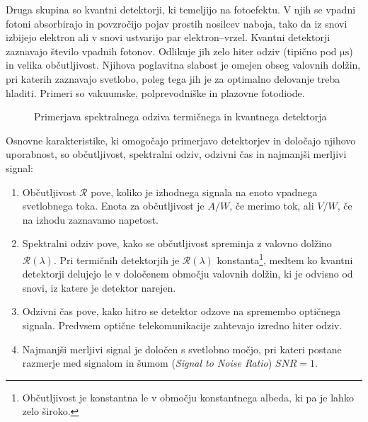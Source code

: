 Druga skupina so kvantni detektorji, ki temeljijo na fotoefektu.
V njih se vpadni fotoni absorbirajo in povzročijo pojav prostih nosilcev naboja, 
tako da iz snovi izbijejo elektron ali v snovi ustvarijo par elektron--vrzel. Kvantni 
detektorji zaznavajo število vpadnih fotonov. Odlikuje jih zelo hiter odziv 
(tipično pod $\si{\micro\second}$)
in velika občutljivost. Njihova poglavitna slabost je omejen obseg valovnih dolžin,
pri katerih zaznavajo svetlobo, poleg tega jih je za optimalno delovanje treba 
hladiti. Primeri so vakuumske, polprevodniške in plazovne fotodiode.
\begin{figure}[h]
\centering
\def\svgwidth{60truemm} 

\caption{Primerjava spektralnega odziva termičnega in kvantnega detektorja}
\label{fig:shemaTermKv}
\end{figure}

Osnovne karakteristike, ki omogočajo primerjavo detektorjev in določajo njihovo uporabnost,
so občutljivost, spektralni odziv, odzivni čas in najmanjši merljivi signal:

\begin{enumerate}
\item Občutljivost $\mathcal{R}$ pove, koliko je izhodnega signala 
na enoto vpadnega svetlobnega toka. Enota za občutljivost je $\si{A/W}$, če merimo tok, ali 
$\si{V/W}$, če na izhodu zaznavamo napetost. 
\item Spektralni odziv pove, kako se občutljivost spreminja z valovno dolžino $\mathcal{R}(\lambda)$.
Pri termičnih detektorjih je $\mathcal{R}(\lambda)$ konstanta\footnote{Občutljivost je konstantna
le v območju konstantnega albeda, ki pa je lahko zelo široko.}, medtem ko kvantni detektorji 
delujejo le v določenem območju valovnih dolžin, ki je odvisno od snovi, 
iz katere je detektor narejen. 
\item Odzivni čas pove, kako hitro se detektor odzove na spremembo optičnega signala. Predvsem 
optične telekomunikacije zahtevajo izredno hiter odziv.
\item Najmanjši merljivi signal je določen s svetlobno močjo, pri kateri postane razmerje med 
signalom in šumom ({\it Signal to Noise Ratio}) $SNR = 1$. 
\end{enumerate}

